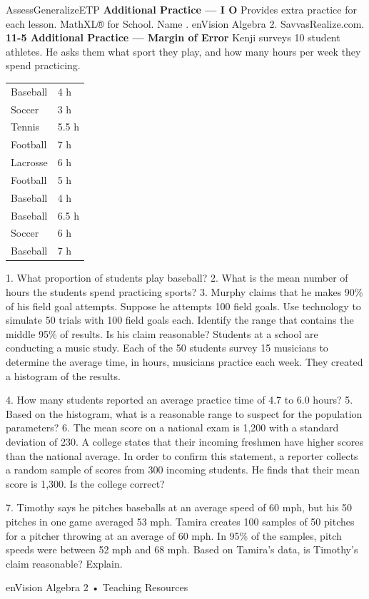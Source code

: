 \documentclass{article}
\newenvironment{te-addendum}[2]{}{}     %
\newcommand{\answer}[1]{}               %
\newcommand{\placeholder}[2]{}          %
\begin{document}
\begin{te-addendum}{Assess}{GeneralizeETP}
\textbf{Additional Practice — I O}
Provides extra practice for each lesson. MathXL® for School.
Name \underline{\hspace{2cm}}. enVision Algebra 2. SavvasRealize.com.
\textbf{11-5 Additional Practice — Margin of Error}
Kenji surveys 10 student athletes. He asks them what sport they play, and how many hours per week they spend practicing.
\begin{tabular}{ll}
Baseball & 4 h \\
Soccer & 3 h \\
Tennis & 5.5 h \\
Football & 7 h \\
Lacrosse & 6 h \\
Football & 5 h \\
Baseball & 4 h \\
Baseball & 6.5 h \\
Soccer & 6 h \\
Baseball & 7 h \\
\end{tabular}
1. What proportion of students play baseball? \answer{40\%}
2. What is the mean number of hours the students spend practicing sports? \answer{5.4 h}
3. Murphy claims that he makes 90\% of his field goal attempts. Suppose he attempts 100 field goals. Use technology to simulate 50 trials with 100 field goals each. Identify the range that contains the middle 95\% of results. Is his claim reasonable? \answer{Answers will vary.}
Students at a school are conducting a music study. Each of the 50 students survey 15 musicians to determine the average time, in hours, musicians practice each week. They created a histogram of the results.
\placeholder{graph}{Results of 50 Samples. Horizontal Hours Spent Practicing bins 3.3–3.9, 4.0–4.6, 4.7–5.3, 5.4–6.0, 6.1–6.7, 6.8–7.3. Vertical Number of Samples ticks 0 to 16 by 2. Gray bars have heights 4, 6, 13, 15, 8, 4. Final bin endpoint appears 7.3, though regular bin widths would give 7.4.}
4. How many students reported an average practice time of 4.7 to 6.0 hours? \answer{28}
5. Based on the histogram, what is a reasonable range to suspect for the population parameters? \answer{4 to 6.7 h}
6. The mean score on a national exam is 1,200 with a standard deviation of 230. A college states that their incoming freshmen have higher scores than the national average. In order to confirm this statement, a reporter collects a random sample of scores from 300 incoming students. He finds that their mean score is 1,300. Is the college correct?
\answer{Yes. The margin of error is 26.6, so 95\% of random samples of 300 students would have means between 1,173.4 and 1,226.6.}
7. Timothy says he pitches baseballs at an average speed of 60 mph, but his 50 pitches in one game averaged 53 mph. Tamira creates 100 samples of 50 pitches for a pitcher throwing at an average of 60 mph. In 95\% of the samples, pitch speeds were between 52 mph and 68 mph. Based on Tamira's data, is Timothy's claim reasonable? Explain.
\answer{Yes, since the average from his game falls within the range of 52 to 68 mph, it is likely that Timothy's pitches average 60 mph.}
enVision Algebra 2 • Teaching Resources
\end{te-addendum}
\end{document}
